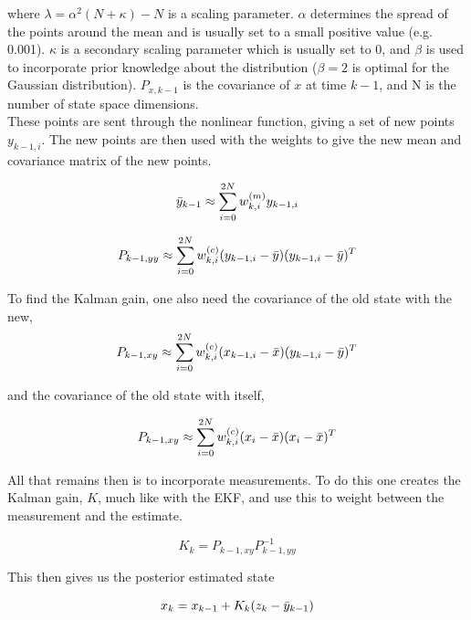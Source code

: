where $\lambda = \alpha^2(N+\kappa) - N$ is a scaling parameter. $\alpha$ determines the spread of the points around the mean and is usually set to a small positive value (e.g. 0.001). $\kappa$ is a secondary scaling parameter which is usually set to 0, and $\beta$ is used to incorporate prior knowledge about the distribution ($\beta=2$ is optimal for the Gaussian distribution). $P_{x,k-1}$ is the covariance of $x$ at time $k-1$, and N is the number of state space dimensions. \\

These points are sent through the nonlinear function, giving a set of new points $y_{k-1,i}$. The new points are then used with the weights to give the new mean and covariance matrix of the new points. 


\begin{equation}
    \Bar{y}_{k-1} \approx \sum_{i=0}^{2N} w_{k,i}^{(m)}y_{k-1,i}
\end{equation}

\begin{equation}
    P_{k-1, yy} \approx \sum_{i=0}^{2N} w_{k,i}^{(c)}(y_{k-1,i} - \Bar{y})(y_{k-1,i} - \Bar{y})^T
\end{equation}

To find the Kalman gain, one also need the covariance of the old state with the new, 
\begin{equation}
    P_{k-1, xy} \approx \sum_{i=0}^{2N} w_{k,i}^{(c)}(x_{k-1,i} - \Bar{x})(y_{k-1,i} - \Bar{y})^T
\end{equation}

and the covariance of the old state with itself,

\begin{equation}
    P_{k-1,xy} \approx \sum_{i=0}^{2N}w_{k,i}^{(c)}(x_i - \Bar{x})(x_i - \Bar{x})^T
\end{equation}

All that remains then is to incorporate measurements. To do this one creates the Kalman gain, $K$, much like with the EKF, and use this to weight between the measurement and the estimate.

\begin{equation}
    K_k = P_{k-1,xy}P_{k-1,yy}^{-1}
\end{equation}

This then gives us the posterior estimated state

\begin{equation}
    x_k = x_{k-1} + K_k(z_k - \Bar{y}_{k-1})
\end{equation}

